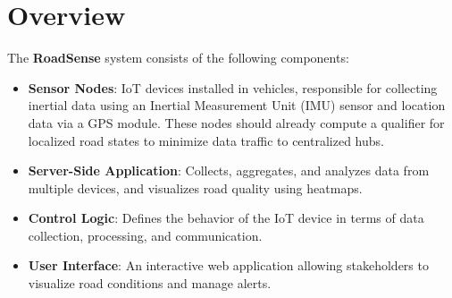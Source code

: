 \section{Overview}

The \textbf{RoadSense} system consists of the following components:
\begin{itemize}
    \item \textbf{Sensor Nodes}: IoT devices installed in vehicles, responsible for collecting inertial data using an Inertial Measurement Unit (IMU) sensor and location data via a GPS module. These nodes should already compute a qualifier for localized road states to minimize data traffic to centralized hubs.
    \item \textbf{Server-Side Application}: Collects, aggregates, and analyzes data from multiple devices, and visualizes road quality using heatmaps.
    \item \textbf{Control Logic}: Defines the behavior of the IoT device in terms of data collection, processing, and communication.
    \item \textbf{User Interface}: An interactive web application allowing stakeholders to visualize road conditions and manage alerts.
\end{itemize}